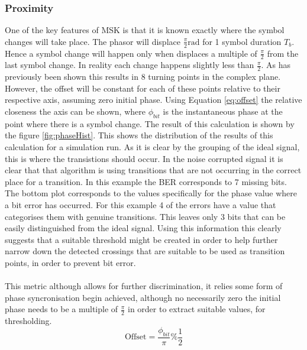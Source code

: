 \subsubsection{Proximity}
One of the key features of MSK is that it is known exactly where the symbol changes will take place. The phasor will displace $\frac{\pi}{2}\si{\radian}$ for 1 symbol duration $T_b$. Hence a symbol change will happen only when displaces a multiple of $\frac{\pi}{2}$ from the last symbol change. In reality each change happens slightly less than $\frac{\pi}{2}$. As has previously been shown this results in 8 turning points in the complex plane. However, the offset will be constant for each of these points relative to their respective axis, assuming zero initial phase. Using Equation \ref{eq:offset} the relative closeness the axis can be shown, where $\phi_{bit}$ is the instantaneous phase at the point where there is a symbol change. The result of this calculation is shown by the figure \ref{fig:phaseHist}. This shows the distribution of the results of this calculation for a simulation run. As it is clear by the grouping of the ideal signal, this is where the transistions should occur. In the noise corrupted signal it is clear that that algorithm is using transitions that are not occurring in the correct place for a transition. In this example the BER corresponds to 7 missing bits. The bottom plot corresponds to the values specifically for the phase value where a bit error has occurred. For this example 4 of the errors have a value that categorises them with genuine transitions. This leaves only 3 bits that can be easily distinguished from the ideal signal. Using this information this clearly suggests that a suitable threshold might be created in order to help further narrow down the detected crossings that are suitable to be used as transition points, in order to prevent bit error.
\\\\
This metric although allows for further discrimination, it relies some form of phase syncronisation begin achieved, although no necessarily zero the initial phase needs to be a multiple of $\frac{\pi}{2}$ in order to extract suitable values, for thresholding. 
\begin{equation}
    \text{Offset} = \frac{\phi_{bit}}{\pi} \% \frac{1}{2}
    \label{eq:offset}
\end{equation}

